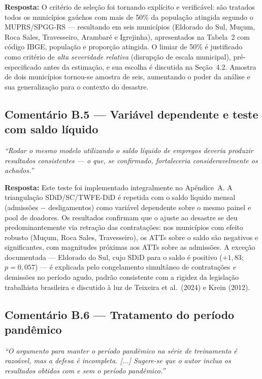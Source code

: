 \documentclass[a4paper,12pt]{article}
\newcommand{\avB}[1]{\textcolor{corB}{\textit{#1}}}
\newcommand{\resposta}[1]{\noindent\textbf{Resposta:} #1}
\begin{document}
\bigskip

\resposta{O critério de seleção foi tornando explícito e verificável: são tratados todos
os municípios gaúchos com mais de 50\% da população atingida segundo o MUPRS/SPGG-RS
— resultando em seis municípios (Eldorado do Sul, Muçum, Roca Sales, Travesseiro,
Arambaré e Igrejinha), apresentados na Tabela~2 com código IBGE, população e
proporção atingida. O limiar de 50\% é justificado como critério de \textit{alta
severidade relativa} (disrupção de escala municipal), pré-especificado antes da
estimação, e sua escolha é discutida na Seção~4.2. Amostra de dois municípios tornou-se
amostra de seis, aumentando o poder da análise e sua generalização para o contexto
do desastre.}

\bigskip

\subsection*{Comentário B.5 — Variável dependente e teste com saldo líquido}

\avB{``Rodar o mesmo modelo utilizando o saldo líquido de empregos deveria produzir
resultados consistentes — o que, se confirmado, fortaleceria consideravelmente os
achados.''}

\bigskip

\resposta{Este teste foi implementado integralmente no Apêndice~A. A triangulação
SDiD/SC/TWFE-DiD é repetida com o saldo líquido mensal (admissões $-$ desligamentos)
como variável dependente sobre o mesmo painel e pool de doadores. Os resultados
confirmam que o ajuste ao desastre se deu predominantemente via retração das
contratações: nos municípios com efeito robusto (Muçum, Roca Sales, Travesseiro), os
ATTs sobre o saldo são negativos e significantes, com magnitudes próximas aos ATTs
sobre as admissões. A exceção documentada — Eldorado do Sul, cujo SDiD para o saldo
é positivo ($+1{,}83$; $p = 0{,}057$) — é explicada pelo congelamento simultâneo de
contratações \textit{e} demissões no período agudo, padrão consistente com a rigidez
da legislação trabalhista brasileira e discutido à luz de Teixeira et al.\ (2024) e
Krein (2012).}

\bigskip

\subsection*{Comentário B.6 — Tratamento do período pandêmico}

\avB{``O argumento para manter o período pandêmico na série de treinamento é razoável,
mas a defesa é incompleta. [...] Sugere-se que o autor inclua os resultados obtidos
com e sem o período pandêmico.''}
\end{document}
